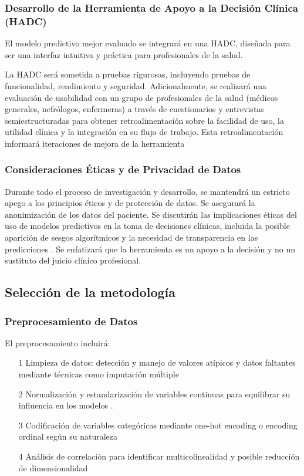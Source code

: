 \documentclass{article}
\begin{document}
\subsubsection{Desarrollo de la Herramienta de Apoyo a la
Decisión Clínica (HADC)}

El modelo predictivo mejor evaluado se integrará en una
HADC, diseñada para ser una interfaz intuitiva y práctica
para profesionales de la salud.

La HADC será sometida a pruebas rigurosas, incluyendo
pruebas de funcionalidad, rendimiento y seguridad.
Adicionalmente, se realizará una evaluación de usabilidad
con un grupo de profesionales de la salud (médicos
generales, nefrólogos, enfermeras) a través de cuestionarios
y entrevistas semiestructuradas para obtener
retroalimentación sobre la facilidad de uso, la utilidad
clínica y la integración en su flujo de trabajo. Esta
retroalimentación informará iteraciones de mejora de la
herramienta \cite{Zhang2011}
\subsubsection{ Consideraciones Éticas y de Privacidad de
Datos}

Durante todo el proceso de investigación y desarrollo, se
mantendrá un estricto apego a los principios éticos y de
protección de datos. Se asegurará la anonimización de los
datos del paciente. Se discutirán las implicaciones éticas
del uso de modelos predictivos en la toma de decisiones
clínicas, incluida la posible aparición de sesgos
algorítmicos y la necesidad de transparencia en las
predicciones \cite{Chen2016}. Se enfatizará que la
herramienta es un apoyo a la decisión y no un sustituto del
juicio clínico profesional.

\subsection{Selección de la metodología}
\subsubsection{Preprocesamiento de Datos}
El preprocesamiento incluirá:

\begin{itemize}
    \item[1] Limpieza de datos: detección y manejo de valores atípicos y
        datos faltantes mediante técnicas como imputación múltiple
        \cite{buuren2011mice}
    \item[2] Normalización y estandarización de variables continuas para
        equilibrar su influencia en los modelos \cite{geron2019hands}.
    \item[3] Codificación de variables categóricas mediante one-hot
        encoding o encoding ordinal según su naturaleza
        \cite{hosmer2013applied}
    \item[4] Análisis de correlación para identificar multicolinealidad y
        posible reducción de dimensionalidad
        \cite{hastie2009elements}
\end{itemize}
\end{document}
